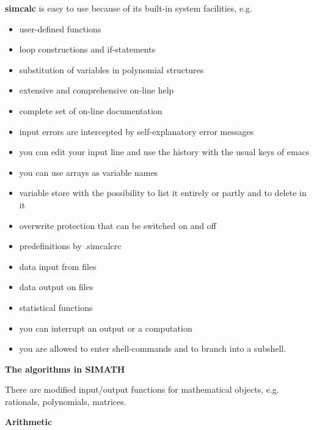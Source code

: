 \vspace{0.4cm}

\noindent
{\bf simcalc} is easy to use because of its
built-in system facilities, e.g.
\begin{itemize}
\item user-defined functions
\item loop constructions and if-statements
\item substitution of variables in polynomial structures
\item extensive and comprehensive on-line help
\item complete set of on-line documentation
\item input errors are intercepted by self-explanatory error messages
\item you can edit your input line and use the history with the 
usual keys of emacs
\item you can use arrays as variable names
\item variable store with the possibility to list it entirely or partly
and to delete in it
\item overwrite protection that can be switched on and off
\item predefinitions by .simcalcrc
\item data input from files
\item data output on files
\item statistical functions
\item you can interrupt an output or a computation
\item you are allowed to enter shell-commands and to branch into a 
subshell.
\end{itemize}
\newpage


\begin{center}
{\Large {\bf The algorithms in SIMATH}}
\end{center}

\vspace{0.3cm}

\noindent
There are modified input/output functions for mathematical objects,
e.g. rationals, polynomials, matrices.

\vspace{0.4cm}

\begin{center}
{\large {\bf Arithmetic}}
\end{center}

